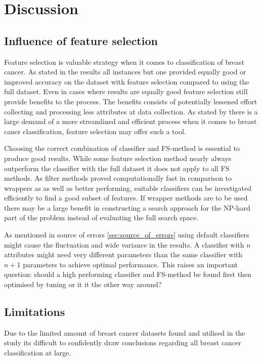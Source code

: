 \chapter{Discussion}

\section{Influence of feature selection}

Feature selection is valuable strategy when it comes to classification of breast cancer. As stated in the results all instances but one provided equally good or improved accuracy on the dataset with feature selection compared to using the full dataset. Even in cases where results are equally good feature selection still provide benefits to the process. The benefits consists of potentially lessened effort collecting and processing less attributes at data collection. As stated by \textcite{martei2018} there is a large demand of a more streamlined and efficient process when it comes to breast caner classification, feature selection may offer such a tool.

Choosing the correct combination of classifier and FS-method is essential to produce good results. While some feature selection method nearly always outperform the classifier with the full dataset it does not apply to all FS methods. As filter methods proved computationally fast in comparison to wrappers as as well as better performing, suitable classifiers can be investigated efficiently to find a good subset of features. If wrapper methods are to be used there may be a large benefit in constructing a search approach for the NP-hard part of the problem instead of evaluating the full search space.

As mentioned in source of errors \ref{sec:source_of_errors} using default classifiers might cause the fluctuation and wide variance in the results. A classifier with $n$ attributes might need very different parameters than the same classifier with $n + 1$ parameters to achieve optimal performance. This raises an important question: should a high performing classifier and FS-method be found first then optimised by tuning or it it the other way around?


\section{Limitations}

Due to the limited amount of breast cancer datasets found and utilised in the study its difficult to confidently draw conclusions regarding all breast cancer classification at large.


